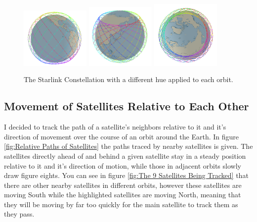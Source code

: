 \documentclass[12pt,a4paper,twoside,openright]{report}
\begin{document}
\begin{figure}
\label{fig:Structure of Network}
\caption{The Starlink Constellation with a different hue applied to each orbit.}
\includegraphics[width=0.3\textwidth]{Hue1}
\includegraphics[width=0.3\textwidth]{Hue2}
\includegraphics[width=0.3\textwidth]{Hue3}
\end{figure}

\subsection{Movement of Satellites Relative to Each Other}

I decided to track the path of a satellite's neighbors relative to it and it's direction of movement over the course of an orbit around the Earth. In figure \ref{fig:Relative Paths of Satellites} the paths traced by nearby satellites is given. The satellites directly ahead of and behind a given satellite stay in a steady position relative to it and it's direction of motion, while those in adjacent orbits slowly draw figure eights. You can see in figure \ref{fig:The 9 Satellites Being Tracked} that there are other nearby satellites in different orbits, however these satellites are moving South while the highlighted satellites are moving North, meaning that they will be moving by far too quickly for the main satellite to track them as they pass. \cite{OriginalReport}
\end{document}
